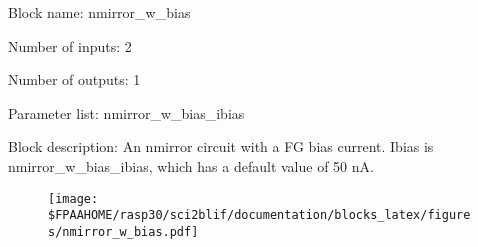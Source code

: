 \pagebreak

Block name: nmirror\_w\_bias

Number of inputs: 2

Number of outputs: 1

Parameter list: nmirror\_w\_bias\_ibias

Block description: 
An nmirror circuit with a FG bias current. Ibias is nmirror\_w\_bias\_ibias, which has a default value of 50 nA.

\begin{figure}[H]  %
\texttt{[image: \$FPAAHOME/rasp30/sci2blif/documentation/blocks\_latex/figures/nmirror\_w\_bias.pdf]}
\end{figure}

